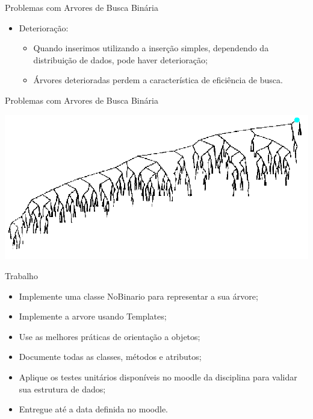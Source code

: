 \documentclass[12pt,table,xcolor={dvipsnames}]{beamer}
\begin{document}
\begin{frame}[fragile]{Problemas com Arvores de Busca Binária}
          \begin{itemize}
          \item Deterioração:
		  \begin{itemize}
		  \item Quando inserimos utilizando a inserção simples, dependendo da distribuição de dados, pode haver deterioração;
		  \item Árvores deterioradas perdem a característica de eficiência de busca.
		  \end{itemize}
       	  \end{itemize}
\end{frame}

\begin{frame}[fragile]{Problemas com Arvores de Busca Binária}
\begin{center}
\includegraphics[scale=.35]{deter1.png} 
\end{center}
\end{frame}


\begin{frame}[fragile]{Trabalho}
\begin{itemize}
\item Implemente uma classe NoBinario para representar a sua árvore;
\item Implemente a arvore usando Templates;
\item Use as melhores práticas de orientação a objetos;
\item Documente todas as classes, métodos e atributos;
\item Aplique os testes unitários disponíveis no moodle da disciplina para validar sua estrutura de dados;
\item Entregue até a data definida no moodle.
\end{itemize}
\end{frame}
\end{document}
